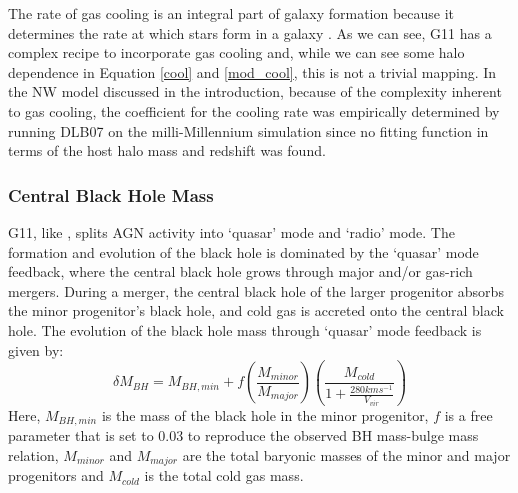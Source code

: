 \documentclass[a4paper,fleqn,usenatbib]{mnras}
\begin{document}
\par The rate of gas cooling is an integral part of galaxy formation because it determines the rate at which stars form in a galaxy \citep{baugh2006primer}. As we can see, G11 has a complex recipe to incorporate gas cooling and, while we can see some halo dependence in Equation \ref{cool} and \ref{mod_cool}, this is not a trivial mapping. In the NW model discussed in the introduction, because of the complexity inherent to gas cooling, the coefficient for the cooling rate was empirically determined by running DLB07 on the milli-Millennium simulation since no fitting function in terms of the host halo mass and redshift was found. 
 
\subsubsection{Central Black Hole Mass} \label{mdf: db_sam_bh}
\par G11, like \citet{croton2006many}, splits AGN activity into `quasar' mode and `radio' mode. The formation and evolution of the black hole is dominated by the `quasar' mode feedback, where the central black hole grows through major and/or gas-rich mergers. During a merger, the central black hole of the larger progenitor absorbs the minor progenitor's black hole, and cold gas is accreted onto the central black hole. The evolution of the black hole mass through `quasar' mode feedback is given by:
\begin{equation}
\delta M_{BH} = M_{BH,min} + f\left(\frac{M_{minor}}{M_{major}}\right) \left(\frac{M_{cold}}{1 + \frac{280 km s^{-1}}{V_{vir}}}\right) 
\label{quasar}
\end{equation}
Here, $M_{BH,min}$ is the mass of the black hole in the minor progenitor, $f$ is a free parameter that is set to 0.03 to reproduce the observed BH mass-bulge mass relation, $M_{minor}$ and $M_{major}$ are the total baryonic masses of the minor and major progenitors and $M_{cold}$ is the total cold gas mass.
 
\end{document}
